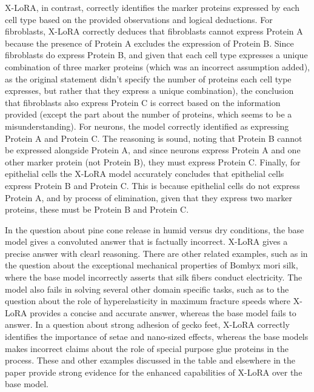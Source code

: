 \documentclass{article}
\begin{document}
X-LoRA, in contrast, correctly identifies the marker proteins expressed by each cell type based on the provided observations and logical deductions. For fibroblasts, X-LoRA correctly deduces that fibroblasts cannot express Protein A because the presence of Protein A excludes the expression of Protein B. Since fibroblasts do express Protein B, and given that each cell type expresses a unique combination of three marker proteins (which was an incorrect assumption added), as the original statement didn't specify the number of proteins each cell type expresses, but rather that they express a unique combination), the conclusion that fibroblasts also express Protein C is correct based on the information provided (except the part about the number of proteins, which seems to be a misunderstanding). For neurons, the model correctly identified as expressing Protein A and Protein C. The reasoning is sound, noting that Protein B cannot be expressed alongside Protein A, and since neurons express Protein A and one other marker protein (not Protein B), they must express Protein C. Finally, for epithelial cells the X-LoRA model accurately concludes that epithelial cells express Protein B and Protein C. This is because epithelial cells do not express Protein A, and by process of elimination, given that they express two marker proteins, these must be Protein B and Protein C.

In the question about pine cone release in humid versus dry conditions, the base model gives a convoluted answer that is factually incorrect. X-LoRA gives a precise answer with clearl reasoning. There are other related examples, such as in the question about the exceptional mechanical properties of Bombyx mori silk, where the base model incorrectly asserts that silk fibers conduct electricity. The model also fails in solving several other domain specific tasks, such as to the question about the role of hyperelasticity in maximum fracture speeds where X-LoRA provides a concise and accurate answer, whereas the base model fails to answer. In a question about strong adhesion of gecko feet, X-LoRA correctly identifies the importance of setae and nano-sized effects, whereas the base models makes incorrect claims about the role of special purpose glue proteins in the process. These and other examples discussed in the table and elsewhere in the paper provide strong evidence for the enhanced capabilities of X-LoRA over the base model. 




\begingroup %
\tiny %
\end{document}
